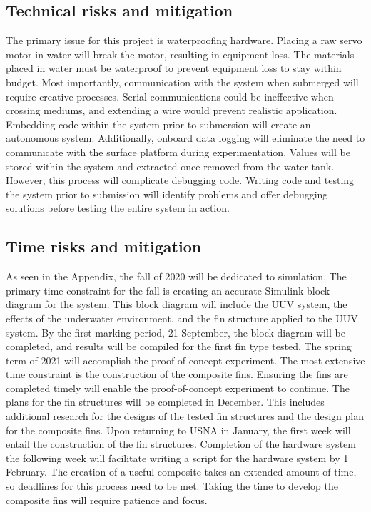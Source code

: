 \documentclass{IEEEtran}
\begin{document}
\subsection{Technical risks and mitigation}
The primary issue for this project is waterproofing hardware.  Placing a raw servo motor in water will break the motor, resulting in equipment loss.  The materials placed in water must be waterproof to prevent equipment loss to stay within budget.  Most importantly, communication with the system when submerged will require creative processes.  Serial communications could be ineffective when crossing mediums, and extending a wire would prevent realistic application.  Embedding code within the system prior to submersion will create an autonomous system.  Additionally, onboard data logging will eliminate the need to communicate with the surface platform during experimentation.  Values will be stored within the system and extracted once removed from the water tank.  However, this process will complicate debugging code.  Writing code and testing the system prior to submission will identify problems and offer debugging solutions before testing the entire system in action.  

\subsection{Time risks and mitigation}
As seen in the Appendix, the fall of 2020 will be dedicated to simulation.  The primary time constraint for the fall is creating an accurate Simulink block diagram for the system.  This block diagram will include the UUV system, the effects of the underwater environment, and the fin structure applied to the UUV system.  By the first marking period, 21 September, the block diagram will be completed, and results will be compiled for the first fin type tested.  The spring term of 2021 will accomplish the proof-of-concept experiment.  The most extensive time constraint is the construction of the composite fins.  Ensuring the fins are completed timely will enable the proof-of-concept experiment to continue.  The plans for the fin structures will be completed in December.  This includes additional research for the designs of the tested fin structures and the design plan for the composite fins.  Upon returning to USNA in January, the first week will entail the construction of the fin structures.  Completion of the hardware system the following week will facilitate writing a script for the hardware system by 1 February.  The creation of a useful composite takes an extended amount of time, so deadlines for this process need to be met.  Taking the time to develop the composite fins will require patience and focus.  
\end{document}

